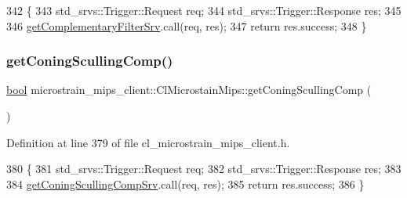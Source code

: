 \begin{DoxyCode}
342     \{
343         std\_srvs::Trigger::Request req;
344         std\_srvs::Trigger::Response res;
345 
346         \hyperlink{classmicrostrain__mips__client_1_1ClMicrostainMips_a6011cb4bf116dc0b92eff7b3409c3633}{getComplementaryFilterSrv}.call(req, res);
347         \textcolor{keywordflow}{return} res.success;
348     \}
\end{DoxyCode}
\mbox{\label{classmicrostrain__mips__client_1_1ClMicrostainMips_ae2c3a98a2f3a2fcc92fe750d885370f4}} 
\subsubsection{\texorpdfstring{get\+Coning\+Sculling\+Comp()}{getConingScullingComp()}}
{\footnotesize\ttfamily \hyperlink{classbool}{bool} microstrain\+\_\+mips\+\_\+client\+::\+Cl\+Microstain\+Mips\+::get\+Coning\+Sculling\+Comp (\begin{DoxyParamCaption}{ }\end{DoxyParamCaption})\hspace{0.3cm}{\ttfamily [inline]}}



Definition at line 379 of file cl\+\_\+microstrain\+\_\+mips\+\_\+client.\+h.


\begin{DoxyCode}
380     \{
381         std\_srvs::Trigger::Request req;
382         std\_srvs::Trigger::Response res;
383 
384         \hyperlink{classmicrostrain__mips__client_1_1ClMicrostainMips_a3958027a0410f29a4c6e0f7376a3665b}{getConingScullingCompSrv}.call(req, res);
385         \textcolor{keywordflow}{return} res.success;
386     \}
\end{DoxyCode}
\mbox{\label{classmicrostrain__mips__client_1_1ClMicrostainMips_aeb81e7280f96ce01a0ea0d0108a177b7}} 
